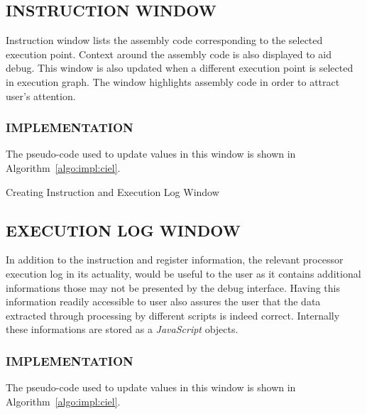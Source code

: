 \subsection {INSTRUCTION WINDOW}

Instruction window lists the assembly code corresponding to the selected execution point. Context around the assembly code is also displayed to aid debug. This window is also updated when a different execution point is selected in execution graph. The window highlights assembly code in order to attract user's attention.

\subsubsection{IMPLEMENTATION}

The pseudo-code used to update values in this window is shown in Algorithm~\ref{algo:impl:ciel}.

\IncMargin{1em}
\begin{algorithm}[h]
\DontPrintSemicolon
{} 
\caption{Creating Instruction and Execution Log Window}
\label{algo:impl:ciel}
\end{algorithm}\DecMargin{1em}

\subsection {EXECUTION LOG WINDOW}

In addition to the instruction and register information, the relevant processor execution log in its actuality, would be useful to the user as it contains additional informations those may not be presented by the debug interface. Having this information readily accessible to user also assures the user that the data extracted through processing by different scripts is indeed correct. Internally these informations are stored as a {\it JavaScript} objects.

\subsubsection{IMPLEMENTATION}

The pseudo-code used to update values in this window is shown in Algorithm~\ref{algo:impl:ciel}.

